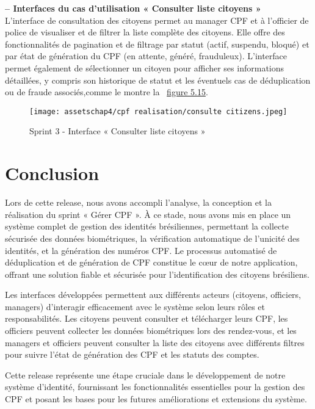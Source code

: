 \textbf{– Interfaces du cas d'utilisation « Consulter liste citoyens »}\\
L'interface de consultation des citoyens permet au manager CPF et à l'officier de police de visualiser et de filtrer la liste complète des citoyens. Elle offre des fonctionnalités de pagination et de filtrage par statut (actif, suspendu, bloqué) et par état de génération du CPF (en attente, généré, frauduleux). L'interface permet également de sélectionner un citoyen pour afficher ses informations détaillées, y compris son historique de statut et les éventuels cas de déduplication ou de fraude associés,comme le montre la ~\hyperref[fig:5.15]{figure 5.15}.

\begin{figure}[H]
\centering
\texttt{[image: assetschap4/cpf realisation/consulte citizens.jpeg]}
\caption{ Sprint 3 - Interface « Consulter liste citoyens » }
\label{fig:5.14}
\end{figure}

\section*{Conclusion}
\label{sec_Conclusion:ch4}
Lors de cette release, nous avons accompli l'analyse, la conception et la réalisation du sprint « Gérer CPF ». À ce stade, nous avons mis en place un système complet de gestion des identités brésiliennes, permettant la collecte sécurisée des données biométriques, la vérification automatique de l'unicité des identités, et la génération des numéros CPF. Le processus automatisé de déduplication et de génération de CPF constitue le cœur de notre application, offrant une solution fiable et sécurisée pour l'identification des citoyens brésiliens.

Les interfaces développées permettent aux différents acteurs (citoyens, officiers, managers) d'interagir efficacement avec le système selon leurs rôles et responsabilités. Les citoyens peuvent consulter et télécharger leurs CPF, les officiers peuvent collecter les données biométriques lors des rendez-vous, et les managers et officiers peuvent consulter la liste des citoyens avec différents filtres pour suivre l'état de génération des CPF et les statuts des comptes.

Cette release représente une étape cruciale dans le développement de notre système d'identité, fournissant les fonctionnalités essentielles pour la gestion des CPF et posant les bases pour les futures améliorations et extensions du système.
